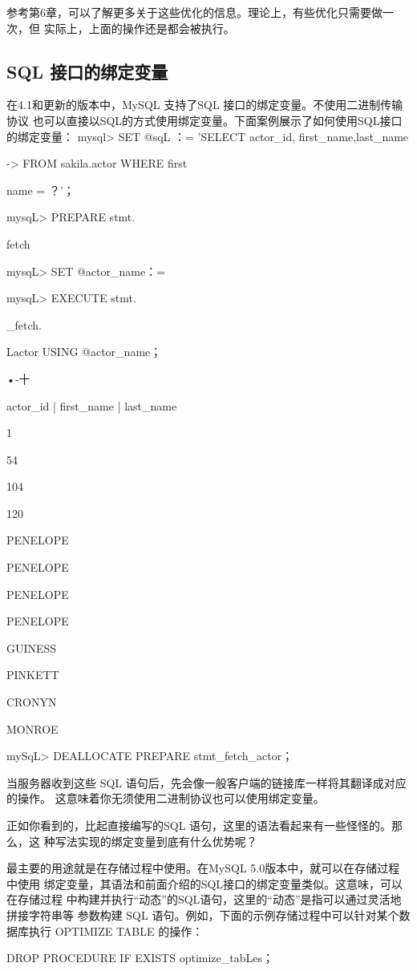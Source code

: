 参考第6章，可以了解更多关于这些优化的信息。理论上，有些优化只需要做一次，但
实际上，上面的操作还是都会被执行。

\subsection{SQL 接口的绑定变量}
在4.1和更新的版本中，MySQL 支持了SQL 接口的绑定变量。不使用二进制传输协议
也可以直接以SQL的方式使用绑定变量。下面案例展示了如何使用SQL接口的绑定变量：
mysql> SET @sqL ：= 'SELECT actor\_id, first\_name,last\_name

-> FROM sakila.actor WHERE first

name = ？'；

mysqL> PREPARE stmt.

fetch

mysqL> SET @actor\_name：=

mysqL> EXECUTE stmt.

\_fetch.

Lactor USING @actor\_name；

•-十

actor\_id | first\_name | last\_name

1

54

104

120

PENELOPE

PENELOPE

PENELOPE

PENELOPE

GUINESS

PINKETT

CRONYN

MONROE

mySqL> DEALLOCATE PREPARE stmt\_fetch\_actor；

当服务器收到这些 SQL 语句后，先会像一般客户端的链接库一样将其翻译成对应的操作。
这意味着你无须使用二进制协议也可以使用绑定变量。

正如你看到的，比起直接编写的SQL 语句，这里的语法看起来有一些怪怪的。那么，这
种写法实现的绑定变量到底有什么优势呢？

最主要的用途就是在存储过程中使用。在MySQL 5.0版本中，就可以在存储过程中使用
绑定变量，其语法和前面介绍的SQL接口的绑定变量类似。这意味，可以在存储过程
中构建并执行“动态”的SQL语句，这里的“动态”是指可以通过灵活地拼接字符串等
参数构建 SQL 语句。例如，下面的示例存储过程中可以针对某个数据库执行 OPTIMIZE
TABLE 的操作：

DROP PROCEDURE IF EXISTS optimize\_tabLes；

